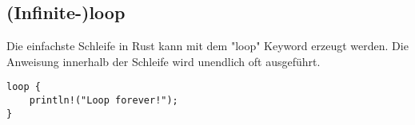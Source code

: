 \subsection{(Infinite-)loop}
Die einfachste Schleife in Rust kann mit dem "loop" Keyword erzeugt werden. Die Anweisung innerhalb der Schleife wird unendlich oft ausgeführt.

\begin{lstlisting}
loop {
	println!("Loop forever!");
}
\end{lstlisting}